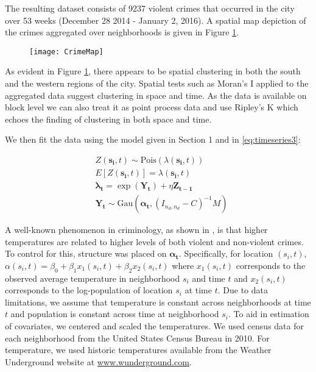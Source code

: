 \documentclass[11pt]{isuthesis}
\begin{document}
	The resulting dataset consists of 9237 violent crimes that occurred in the city over 53 weeks (December 28 2014 - January 2, 2016).  A spatial map depiction of the crimes aggregated over neighborhoods is given in Figure \ref{fig:SpatialOnly}.
	
	
	\begin{figure}[!htp]
		\centering
		\texttt{[image: CrimeMap]}
		\label{fig:SpatialOnly}
	\end{figure}
	
	As evident in Figure \ref{fig:SpatialOnly}, there appears to be spatial clustering in both the south and the western regions of the city.  Spatial tests such as Moran's I applied to the aggregated data suggest clustering in space and time.  As the data is available on block level we can also treat it as point process data and use Ripley's K which echoes the finding of  clustering in both space and time.
	
	We then fit the data using the model given in Section 1 and in \eqref{eq:timeseries3}:
	
	\begin{align}
	& Z(\boldsymbol{s_i},t) \sim \mbox{Pois}(\lambda(\boldsymbol{s_i},t)) \label{eq:timeseries3} \\
	& E[Z(\boldsymbol{s_i},t)]=\lambda(\boldsymbol{s_i},t)\\
	& \boldsymbol{\lambda_t} = \exp(\boldsymbol{Y_t})+\eta \boldsymbol{Z_{t-1}}\\
	& \boldsymbol{Y_t} \sim \mbox{Gau} (\boldsymbol{\alpha_t},(I_{{n_d},{n_d}}-C)^{-1}M)
	\end{align}
	
	A well-known phenomenon in criminology, as shown in \cite{anderson1987temperature}, is that higher temperatures are related to higher levels of both violent and non-violent crimes.  To control for this, structure was placed on $\boldsymbol{\alpha_t}$.  Specifically, for location $(s_i,t)$, $\alpha(s_i,t)=\beta_0 + \beta_1 x_1(s_i,t) + \beta_2 x_2(s_i,t)$ where $x_1(s_i,t)$ corresponds to the observed average temperature in neighborhood $s_i$ and time $t$ and $x_2(s_i,t)$ corresponds to the log-population of location $s_i$ at time $t$.  Due to data limitations, we assume that temperature is constant across neighborhoods at time $t$ and population is constant across time at neighborhood $s_i$.  To aid in estimation of covariates, we centered and scaled the temperatures. We used census data for each neighborhood from the United States Census Bureau in 2010.  For temperature, we used historic temperatures available from the Weather Underground website at \url{www.wunderground.com}.
	
\end{document}
